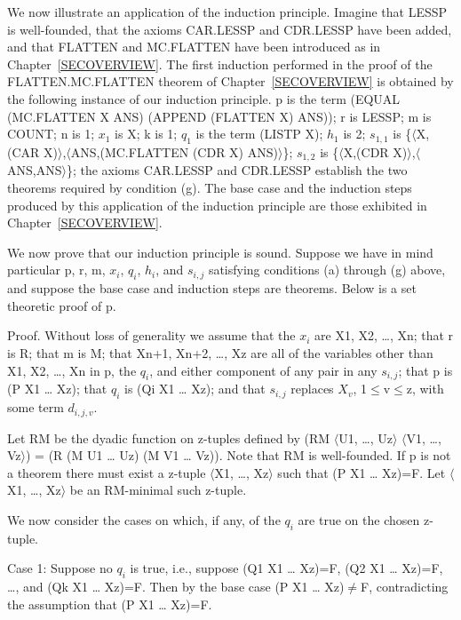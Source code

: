 \documentclass[10pt]{book}
\begin{document}
We now illustrate an application of the induction principle.
Imagine that LESSP is well-founded,
that the axioms CAR.LESSP and CDR.LESSP have been added, and that
FLATTEN and MC.FLATTEN have been introduced as in Chapter~\ref{SECOVERVIEW}.
The first induction performed in the proof of the FLATTEN.MC.FLATTEN
theorem of Chapter~\ref{SECOVERVIEW} is obtained by the following
instance of our induction principle.  p is the term (EQUAL (MC.FLATTEN X ANS)
(APPEND (FLATTEN X) ANS)); r is LESSP; m is COUNT; n is 1; $x_{1}$ is X;
k is 1; $q_{1}$ is the term (LISTP X); $h_{1}$ is 2; $s_{1,1}$ is
\{$\langle$X,(CAR X)$\rangle$,$\langle$ANS,(MC.FLATTEN (CDR X) ANS)$\rangle$\}; $s_{1,2}$ is
\{$\langle$X,(CDR X)$\rangle$,$\langle$ANS,ANS$\rangle$\}; the axioms CAR.LESSP and CDR.LESSP establish
the two theorems required by condition (g).  The base case and the induction
steps produced by this application of the induction principle
are those exhibited in Chapter~\ref{SECOVERVIEW}.

We now prove that our induction principle is sound.
Suppose we have in mind particular p, r, m, $x_{i}$,
$q_{i}$, $h_{i}$, and $s_{i,j}$ satisfying conditions (a) through
(g) above, and suppose the base case and induction steps are
theorems.  Below is a set theoretic proof of p.

Proof.  Without loss of generality we assume that the
$x_{i}$ are X1, X2, \ldots{}, Xn; that r is R; that m is M;
that Xn+1, Xn+2, \ldots{}, Xz are all of the variables other
than X1, X2, \ldots{}, Xn in p, the $q_{i}$, and either component
of any pair in any $s_{i,j}$; that p is (P X1 \ldots{} Xz); that
$q_{i}$ is (Qi X1 \ldots{} Xz); and that $s_{i,j}$ replaces $X_{v}$, 1$\leq$v$\leq$z,
with some term $d_{i,j,v}$.

Let RM be the dyadic function on z-tuples defined by
(RM $\langle$U1, \ldots{}, Uz$\rangle$ $\langle$V1, \ldots{}, Vz$\rangle$) = (R (M U1 \ldots{} Uz) (M V1 \ldots{} Vz)).
Note that RM is well-founded.  If p is not a theorem there must
exist a z-tuple $\langle$X1, \ldots{}, Xz$\rangle$ such that (P X1 \ldots{} Xz)=F.
Let $\langle$X1, \ldots{}, Xz$\rangle$ be an RM-minimal such z-tuple.

We now consider the cases on which, if any, of the $q_{i}$ are
true on the chosen z-tuple.

Case 1:  Suppose no $q_{i}$ is true, i.e., suppose (Q1 X1 \ldots{} Xz)=F,
(Q2 X1 \ldots{} Xz)=F, \ldots{}, and (Qk X1 \ldots{} Xz)=F.  Then by the base case
(P X1 \ldots{} Xz)$\neq$F, contradicting the assumption that (P X1 \ldots{} Xz)=F.
\end{document}
